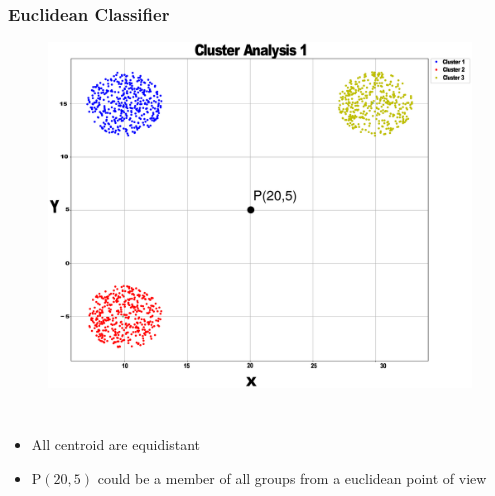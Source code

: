 \documentclass[aspectratio=10]{beamer} %
\begin{document}
\begin{frame}
  \frametitle{Euclidean Classifier}
    \begin{figure}[H]
    	\includegraphics[scale=0.1]{Imagens/clusteranalise1.eps}
    \end{figure}
    
    \begin{columns}
    	\footnotesize
    	\justifying
    \begin{itemize}
    	\footnotesize
    	\item All centroid are equidistant
    	\pause
    	\item P$(20,5)$ could be a member of all groups from a euclidean point of view 
    \end{itemize}
    \end{columns}
  
\end{frame}
\end{document}
